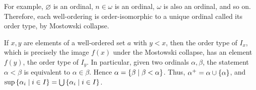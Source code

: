 For example, \( \varnothing \) is an ordinal, \( n \in \omega \) is an ordinal, \( \omega \) is also an ordinal, and so on.
Therefore, each well-ordering is order-isomorphic to a unique ordinal called its order type, by Mostowski collapse.
\begin{remark}
    If \( x, y \) are elements of a well-ordered set \( a \) with \( y < x \), then the order type of \( I_x \), which is precisely the image \( f(x) \) under the Mostowski collapse, has an element \( f(y) \), the order type of \( I_y \).
    In particular, given two ordinals \( \alpha, \beta \), the statement \( \alpha < \beta \) is equivalent to \( \alpha \in \beta \).
    Hence \( \alpha = \qty{\beta \mid \beta < \alpha} \).
    Thus, \( \alpha^+ = \alpha \cup \qty{\alpha} \), and \( \sup \qty{\alpha_i \mid i \in I} = \bigcup \qty{\alpha_i \mid i \in I} \).
\end{remark}

